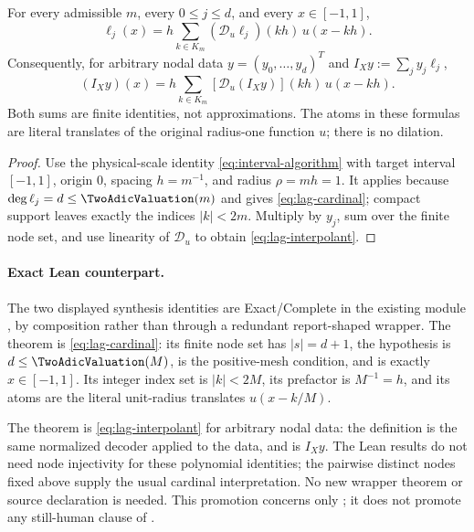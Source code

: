 \begin{theorem}
\label{thm:lag-cardinal}
For every admissible $m$, every $0\le j\le d$, and every
$x\in[-1,1]$,
\begin{equation}
 \boxed{
 \ell_j(x)=h\sum_{k\in K_m}
 (\mathscr D_u\ell_j)(kh)\,u(x-kh).}
 \label{eq:lag-cardinal}
\end{equation}
Consequently, for arbitrary nodal data $y=(y_0,\ldots,y_d)^T$ and
$I_Xy:=\sum_jy_j\ell_j$,
\begin{equation}
 \boxed{
 (I_Xy)(x)=h\sum_{k\in K_m}
 [\mathscr D_u(I_Xy)](kh)\,u(x-kh).}
 \label{eq:lag-interpolant}
\end{equation}
Both sums are finite identities, not approximations.  The atoms in these
formulas are literal translates of the original radius-one function $u$;
there is no dilation.
\end{theorem}

\begin{proof}
Use the physical-scale identity \eqref{eq:interval-algorithm} with target
interval $[-1,1]$, origin $0$, spacing $h=m^{-1}$, and radius
$\rho=mh=1$.  It applies because $\deg\ell_j=d\le\TwoAdicValuation(m)$ and gives
\eqref{eq:lag-cardinal}; compact support leaves exactly the indices
$|k|<2m$.  Multiply by $y_j$, sum over the finite node set, and use linearity
of $\mathscr D_u$ to obtain \eqref{eq:lag-interpolant}.
\end{proof}

\paragraph{Exact Lean counterpart.}
The two displayed synthesis identities are Exact/Complete in the existing
module , by composition rather
than through a redundant report-shaped wrapper.  The theorem
is \eqref{eq:lag-cardinal}: its finite node set has
$\lvert s\rvert=d+1$, the hypothesis
 is
$d\le\TwoAdicValuation(M)$,  is the positive-mesh condition,
and  is exactly $x\in[-1,1]$.  Its integer index set
 is $\lvert k\rvert<2M$, its prefactor is
$M^{-1}=h$, and its atoms are the literal unit-radius translates
$u(x-k/M)$.

The theorem
is \eqref{eq:lag-interpolant} for arbitrary nodal data: the definition
 is the same normalized decoder applied
to the data, and  is $I_Xy$.  The Lean results do
not need node injectivity for these polynomial identities; the pairwise
distinct nodes fixed above supply the usual cardinal interpretation.  No new
wrapper theorem or source declaration is needed.  This promotion concerns
only ; it does not promote any still-human clause of
.

